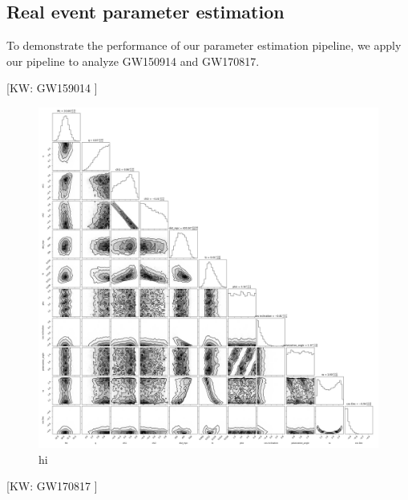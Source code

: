 \documentclass[twocolumn]{aastex631}
\newcommand{\kw}[1]{{\color{rb4}[KW: #1 ]}}
\begin{document}
\subsection{Real event parameter estimation}

To demonstrate the performance of our parameter estimation pipeline, we apply
our pipeline to analyze GW150914 and GW170817. 

\kw{GW159014}

\begin{figure}
\includegraphics[width=0.99\linewidth]{static/GW150914.png}
\caption{
    hi
}
\label{fig:GW150914}
\end{figure}

\kw{GW170817}
\end{document}
